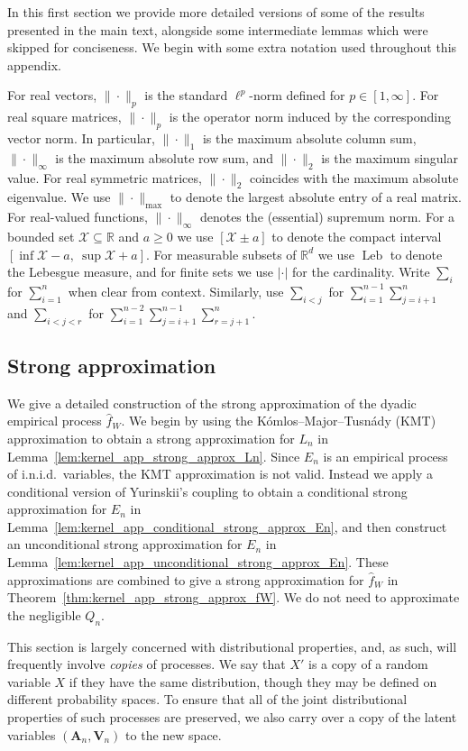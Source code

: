 \documentclass[11pt,lof]{puthesis}
\newcommand{\R}{\ensuremath{\mathbb{R}}}
\newcommand{\bA}{\ensuremath{\mathbf{A}}}
\newcommand{\bV}{\ensuremath{\mathbf{V}}}
\newcommand{\cX}{\ensuremath{\mathcal{X}}}
\DeclareMathOperator{\Leb}{Leb}
\theoremstyle{break}
\theoremstyle{proof}
\begin{document}
In this first section we provide more detailed versions of some of the
results presented in the main text, alongside some intermediate
lemmas which were skipped for conciseness.
We begin with some extra notation used throughout this appendix.

For real vectors,
$\|\cdot\|_p$ is the standard $\ell^p$-norm defined for $p \in [1, \infty]$.
For real square matrices,
$\|\cdot\|_p$ is the operator
norm induced by the corresponding vector norm.
In particular,
$\|\cdot\|_1$
is the maximum absolute column sum,
$\|\cdot\|_\infty$
is the maximum absolute row sum,
and $\|\cdot\|_2$
is the maximum singular value.
For real symmetric matrices,
$\|\cdot\|_2$
coincides with the maximum absolute eigenvalue.
We use $\|\cdot\|_{\max}$
to denote the largest absolute entry of a real matrix.
For real-valued functions,
$\|\cdot\|_\infty$
denotes the (essential) supremum norm.
For a bounded set $\cX \subseteq \R$ and $a \geq 0$
we use $[\cX \pm a]$ to denote the compact interval
$[\inf \cX - a, \ \sup \cX + a]$.
For measurable subsets of $\R^d$
we use $\Leb$ to denote the Lebesgue measure,
and for finite sets we use $|\cdot|$
for the cardinality.
Write $\sum_i$
for $\sum_{i=1}^n$
when clear from context.
Similarly, use $\sum_{i<j}$
for $\sum_{i=1}^{n-1} \sum_{j=i+1}^n$
and $\sum_{i<j<r}$
for $\sum_{i=1}^{n-2} \sum_{j=i+1}^{n-1} \sum_{r=j+1}^n$.

\subsection{Strong approximation}
\label{sec:kernel_app_strong_approx}

We give a detailed construction of the
strong approximation of the dyadic empirical process $\hat f_W$.
We begin by using the
K{\'o}mlos--Major--Tusn{\'a}dy (KMT) approximation
to obtain a strong approximation for $L_n$
in Lemma~\ref{lem:kernel_app_strong_approx_Ln}.
Since $E_n$ is an empirical process of i.n.i.d.\ variables,
the KMT approximation is not valid.
Instead we apply a conditional version of
Yurinskii's coupling to obtain a
conditional strong approximation for $E_n$
in Lemma~\ref{lem:kernel_app_conditional_strong_approx_En},
and then construct an unconditional
strong approximation for $E_n$
in Lemma~\ref{lem:kernel_app_unconditional_strong_approx_En}.
These approximations are combined to give a
strong approximation for $\hat f_W$
in Theorem~\ref{thm:kernel_app_strong_approx_fW}.
We do not need to approximate
the negligible $Q_n$.

This section is largely concerned with
distributional properties,
and, as such, will frequently involve
\emph{copies} of processes.
We say that $X'$ is a copy of a random variable $X$
if they have the same distribution,
though they may be defined on different probability spaces.
To ensure that all of the joint distributional properties of
such processes are preserved,
we also carry over a copy of the latent variables
$(\bA_n, \bV_n)$
to the new space.
\end{document}
